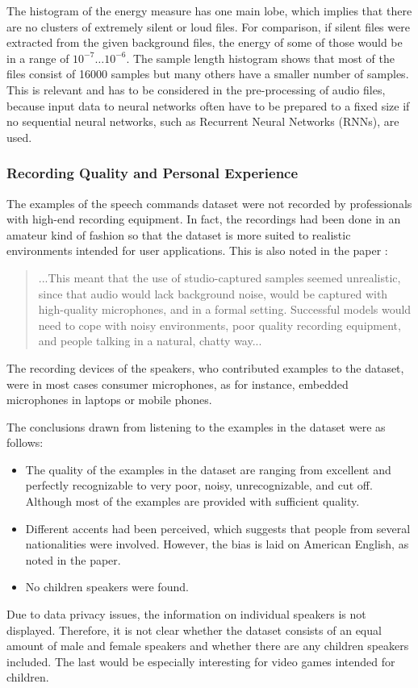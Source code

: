 \FloatBarrier
\noindent
The histogram of the energy measure has one main lobe, which implies that there are no clusters of extremely silent or loud files.
For comparison, if silent files were extracted from the given background files, the energy of some of those would be in a range of $10^{-7} \dots 10^{-6}$.
The sample length histogram shows that most of the files consist of 16000 samples but many others have a smaller number of samples. 
This is relevant and has to be considered in the pre-processing of audio files, because input data to neural networks often have to be prepared to a fixed size if no sequential neural networks, such as Recurrent Neural Networks (RNNs), are used.



\subsubsection{Recording Quality and Personal Experience}
The examples of the speech commands dataset \cite{Warden2018} were not recorded by professionals with high-end recording equipment.
In fact, the recordings had been done in an amateur kind of fashion so that the dataset is more suited to realistic environments intended for user applications.
This is also noted in the paper \cite{Warden2018}:
\begin{quote}
...This meant that the use of studio-captured samples seemed unrealistic, since that audio would lack background noise, would be captured with high-quality microphones, and in a formal setting. 
Successful models would need to cope with noisy environments, poor quality recording equipment, and people talking in a natural, chatty way...
\end{quote}
The recording devices of the speakers, who contributed examples to the dataset, were in most cases consumer microphones, as for instance, embedded microphones in laptops or mobile phones.

The conclusions drawn from listening to the examples in the dataset were as follows:
\begin{itemize}
  \item The quality of the examples in the dataset are ranging from excellent and perfectly recognizable to very poor, noisy, unrecognizable, and cut off. Although most of the examples are provided with sufficient quality.
  \item Different accents had been perceived, which suggests that people from several nationalities were involved.
  However, the bias is laid on American English, as noted in the paper.
  \item No children speakers were found.
\end{itemize}
Due to data privacy issues, the information on individual speakers is not displayed.
Therefore, it is not clear whether the dataset consists of an equal amount of male and female speakers and whether there are any children speakers included.
The last would be especially interesting for video games intended for children.

